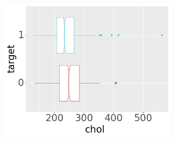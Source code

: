 \begin{figure}[btp]
\begin{subfigure}[b]{0.32\textwidth}
         \includegraphics[width=\textwidth]{plots/target-chol}
     \end{subfigure}


\end{figure}
